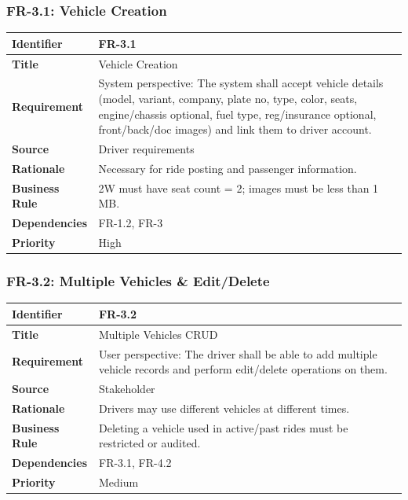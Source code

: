 \subsubsection{FR-3.1: Vehicle Creation}

\begin{longtable}{|p{3cm}|p{12cm}|}
\hline
\rowcolor{lightgray!30}
\textbf{Identifier} & FR-3.1 \\
\hline
\textbf{Title} & Vehicle Creation \\
\hline
\textbf{Requirement} & System perspective: The system shall accept vehicle details (model, variant, company, plate no, type, color, seats, engine/chassis optional, fuel type, reg/insurance optional, front/back/doc images) and link them to driver account. \\
\hline
\textbf{Source} & Driver requirements \\
\hline
\textbf{Rationale} & Necessary for ride posting and passenger information. \\
\hline
\textbf{Business Rule} & 2W must have seat count = 2; images must be less than 1 MB. \\
\hline
\textbf{Dependencies} & FR-1.2, FR-3 \\
\hline
\textbf{Priority} & High \\
\hline
\end{longtable}

\subsubsection{FR-3.2: Multiple Vehicles \& Edit/Delete}

\begin{longtable}{|p{3cm}|p{12cm}|}
\hline
\rowcolor{lightgray!30}
\textbf{Identifier} & FR-3.2 \\
\hline
\textbf{Title} & Multiple Vehicles CRUD \\
\hline
\textbf{Requirement} & User perspective: The driver shall be able to add multiple vehicle records and perform edit/delete operations on them. \\
\hline
\textbf{Source} & Stakeholder \\
\hline
\textbf{Rationale} & Drivers may use different vehicles at different times. \\
\hline
\textbf{Business Rule} & Deleting a vehicle used in active/past rides must be restricted or audited. \\
\hline
\textbf{Dependencies} & FR-3.1, FR-4.2 \\
\hline
\textbf{Priority} & Medium \\
\hline
\end{longtable}

